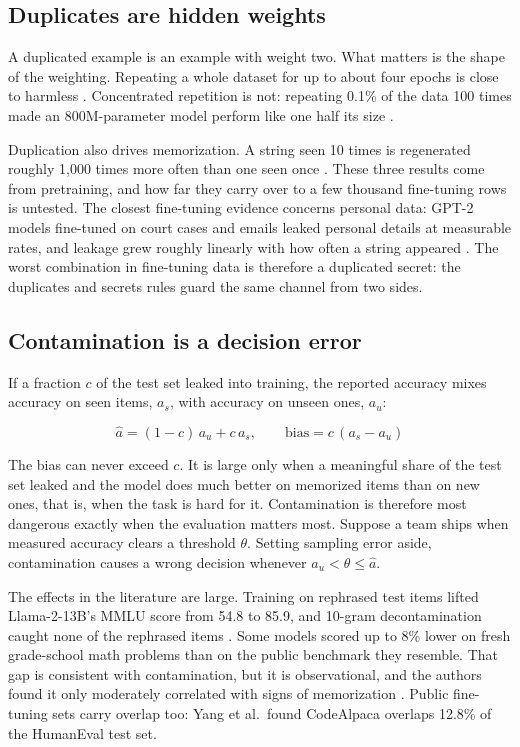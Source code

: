 \subsection{Duplicates are hidden weights}

A duplicated example is an example with weight two. What matters is the shape of the weighting. Repeating a whole dataset for up to about four epochs is close to harmless \citep{muennighoff2023}. Concentrated repetition is not: repeating 0.1\% of the data 100 times made an 800M-parameter model perform like one half its size \citep{hernandez2022repeated}.

Duplication also drives memorization. A string seen 10 times is regenerated roughly 1,000 times more often than one seen once \citep{kandpal2022}. These three results come from pretraining, and how far they carry over to a few thousand fine-tuning rows is untested. The closest fine-tuning evidence concerns personal data: GPT-2 models fine-tuned on court cases and emails leaked personal details at measurable rates, and leakage grew roughly linearly with how often a string appeared \citep{lukas2023}. The worst combination in fine-tuning data is therefore a duplicated secret: the duplicates and secrets rules guard the same channel from two sides.

\subsection{Contamination is a decision error}

If a fraction $c$ of the test set leaked into training, the reported accuracy mixes accuracy on seen items, $a_s$, with accuracy on unseen ones, $a_u$:

\begin{equation}\label{eq:contam}
\hat{a} = (1-c)\,a_u + c\,a_s, \qquad \text{bias} = c\,(a_s - a_u)
\end{equation}

The bias can never exceed $c$. It is large only when a meaningful share of the test set leaked and the model does much better on memorized items than on new ones, that is, when the task is hard for it. Contamination is therefore most dangerous exactly when the evaluation matters most. Suppose a team ships when measured accuracy clears a threshold $\theta$. Setting sampling error aside, contamination causes a wrong decision whenever $a_u < \theta \le \hat{a}$.

The effects in the literature are large.  Training on rephrased test items lifted Llama-2-13B's MMLU score from 54.8 to 85.9, and 10-gram decontamination caught none of the rephrased items \citep{yang2023rephrased}. Some models scored up to 8\% lower on fresh grade-school math problems than on the public benchmark they resemble. That gap is consistent with contamination, but it is observational, and the authors found it only moderately correlated with signs of memorization \citep{zhang2024gsm1k}. Public fine-tuning sets carry overlap too: Yang et al.~found CodeAlpaca overlaps 12.8\% of the HumanEval test set.

